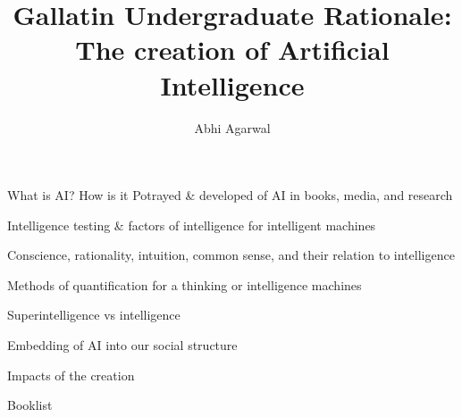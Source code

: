 \documentclass[11pt]{article}
\title{Gallatin Undergraduate Rationale: The creation of Artificial Intelligence}
\author{Abhi Agarwal}
\date{}
\begin{document}
\maketitle


{\Large What is AI? How is it Potrayed \& developed of AI in books, media, and research\par}

{\Large Intelligence testing \& factors of intelligence for intelligent machines\par}

{\Large Conscience, rationality, intuition, common sense, and their relation to intelligence\par}

{\Large Methods of quantification for a thinking or intelligence machines\par}

{\Large Superintelligence vs intelligence\par}

{\Large Embedding of AI into our social structure\par}

{\Large Impacts of the creation\par}

\newpage

{\Large Booklist\\\par}
\end{document}
